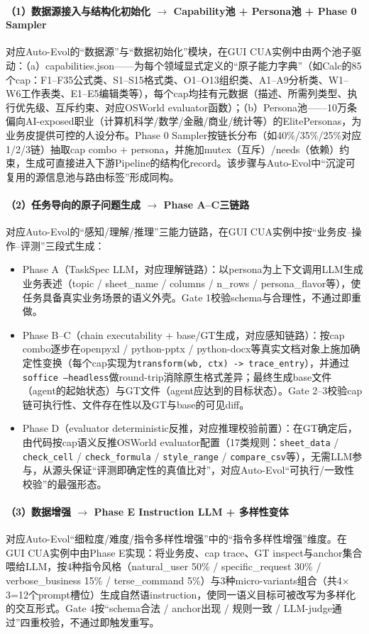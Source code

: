 \paragraph{（1）数据源接入与结构化初始化 $\rightarrow$ Capability池 + Persona池 + Phase 0 Sampler}
对应Auto-Evol的“数据源”与“数据初始化”模块，在GUI CUA实例中由两个池子驱动：（a）capabilities.json——为每个领域显式定义的“原子能力字典”（如Calc的85个cap：F1--F35公式类、S1--S15格式类、O1--O13组织类、A1--A9分析类、W1--W6工作表类、E1--E5编辑类等），每个cap均挂有元数据（描述、所需列类型、执行优先级、互斥约束、对应OSWorld evaluator函数）；（b）Persona池——10万条偏向AI-exposed职业（计算机科学/数学/金融/商业/统计等）的ElitePersonas，为业务皮提供可控的人设分布。Phase 0 Sampler按链长分布（如40\%/35\%/25\%对应1/2/3链）抽取cap combo + persona，并施加mutex（互斥）/needs（依赖）约束，生成可直接进入下游Pipeline的结构化record。该步骤与Auto-Evol中“沉淀可复用的源信息池与路由标签”形成同构。

\paragraph{（2）任务导向的原子问题生成 $\rightarrow$ Phase A--C三链路}
对应Auto-Evol的“感知/理解/推理”三能力链路，在GUI CUA实例中按“业务皮--操作--评测”三段式生成：
\begin{itemize}
  \item Phase A（TaskSpec LLM，对应理解链路）：以persona为上下文调用LLM生成业务表述（topic / sheet\_name / columns / n\_rows / persona\_flavor等），使任务具备真实业务场景的语义外壳。Gate 1校验schema与合理性，不通过即重做。
  \item Phase B--C（chain executability + base/GT生成，对应感知链路）：按cap combo逐步在openpyxl / python-pptx / python-docx等真实文档对象上施加确定性变换（每个cap实现为\texttt{transform(wb, ctx) -> trace\_entry}），并通过\texttt{soffice --headless}做round-trip消除原生格式差异；最终生成base文件（agent的起始状态）与GT文件（agent应达到的目标状态）。Gate 2--3校验cap链可执行性、文件存在性以及GT与base的可见diff。
  \item Phase D（evaluator deterministic反推，对应推理校验前置）：在GT确定后，由代码按cap语义反推OSWorld evaluator配置（17类规则：\texttt{sheet\_data} / \texttt{check\_cell} / \texttt{check\_formula} / \texttt{style\_range} / \texttt{compare\_csv}等），无需LLM参与，从源头保证“评测即确定性的真值比对”，对应Auto-Evol“可执行/一致性校验”的最强形态。
\end{itemize}

\paragraph{（3）数据增强 $\rightarrow$ Phase E Instruction LLM + 多样性变体}
对应Auto-Evol“细粒度/难度/指令多样性增强”中的“指令多样性增强”维度。在GUI CUA实例中由Phase E实现：将业务皮、cap trace、GT inspect与anchor集合喂给LLM，按4种指令风格（natural\_user 50\% / specific\_request 30\% / verbose\_business 15\% / terse\_command 5\%）与3种micro-variants组合（共4$\times$3=12个prompt槽位）生成自然语instruction，使同一语义目标可被改写为多样化的交互形式。Gate 4按“schema合法 / anchor出现 / 规则一致 / LLM-judge通过”四重校验，不通过即触发重写。

